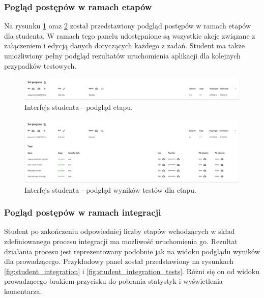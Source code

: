 \subsubsection{Pogląd postępów w ramach etapów}

Na rysunku \ref{fig:student_stage} oraz \ref{fig:student_stage_tests} został przedstawiony podgląd postępów w ramach etapów dla studenta.
W ramach tego panelu udostępnione są wszystkie akcje związane z załączeniem i edycją danych dotyczących każdego z zadań.
Student ma także umożliwiony pełny podgląd rezultatów uruchomienia aplikacji dla kolejnych przypadków testowych.

\begin{figure}[h]
    \centering
    \includegraphics[width = 13cm]{chapter04/student_stage.png}
    \caption{Interfejs studenta - podgląd etapu.}
    \label{fig:student_stage}
\end{figure}

\begin{figure}[h]
    \centering
    \includegraphics[width = 13cm]{chapter04/student_stage_tests.png}
    \caption{Interfejs studenta - podgląd wyników testów dla etapu.}
    \label{fig:student_stage_tests}
\end{figure}

\subsubsection{Pogląd postępów w ramach integracji}

Student po zakończeniu odpowiedniej liczby etapów wchodzących w skład zdefiniowanego procesu integracji ma możliwość uruchomienia go.
Rezultat działania procesu jest reprezentowany podobnie jak na widoku podglądu wyników dla prowadzącego.
Przykładowy panel został przedstawiony na rysunkach \ref{fig:student_integration} i \ref{fig:student_integration_tests}.
Różni się on od widoku prowadzącego brakiem przycisku do pobrania statystyk i wyświetlenia komentarza.

